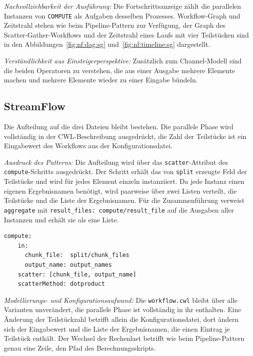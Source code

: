 \emph{Nachvollziehbarkeit der Ausführung:} Die Fortschrittsanzeige
zählt die parallelen Instanzen von \texttt{COMPUTE} als Aufgaben
desselben Prozesses. Workflow-Graph und Zeitstrahl stehen wie beim
Pipeline-Pattern zur Verfügung, der Graph des
Scatter-Gather-Workflows und der Zeitstrahl eines Laufs mit vier
Teilstücken sind in den Abbildungen~\ref{fig:nf:dag:sg}
und~\ref{fig:nf:timeline:sg} dargestellt.

\emph{Verständlichkeit aus Einsteigerperspektive:} Zusätzlich zum
Channel-Modell sind die beiden Operatoren zu verstehen, die aus einer
Ausgabe mehrere Elemente machen und mehrere Elemente wieder zu einer
Eingabe bündeln.

\subsection{StreamFlow}
\label{sec:lokal:sg:streamflow}

Die Aufteilung auf die drei Dateien bleibt bestehen. Die parallele
Phase wird vollständig in der CWL-Beschreibung ausgedrückt, die Zahl
der Teilstücke ist ein Eingabewert des Workflows aus der
Konfigurationsdatei.

\emph{Ausdruck des Patterns:} Die Aufteilung wird über das
\texttt{scatter}-Attribut des \texttt{compute}-Schritts ausgedrückt.
Der Schritt erhält das von \texttt{split} erzeugte Feld der
Teilstücke und wird für jedes Element einzeln instanziiert. Da jede
Instanz einen eigenen Ergebnisnamen benötigt, wird paarweise über
zwei Listen verteilt, die Teilstücke und die Liste der Ergebnisnamen.
Für die Zusammenführung verweist \texttt{aggregate} mit
\texttt{result\_files: compute/result\_file} auf die Ausgaben aller
Instanzen und erhält sie als eine Liste.

\begin{lstlisting}[caption={Fan-out über scatter am compute-Schritt (StreamFlow, Scatter-Gather)},label={lst:sg:sf}]
  compute:
    in:
      chunk_file:  split/chunk_files
      output_name: output_names
    scatter: [chunk_file, output_name]
    scatterMethod: dotproduct
\end{lstlisting}

\emph{Modellierungs- und Konfigurationsaufwand:} Die
\texttt{workflow.cwl} bleibt über alle Varianten unverändert, die
parallele Phase ist vollständig in ihr enthalten. Eine Änderung der
Teilstückzahl betrifft allein die Konfigurationsdatei, dort ändern
sich der Eingabewert und die Liste der Ergebnisnamen, die einen
Eintrag je Teilstück enthält. Der Wechsel der Rechenlast betrifft wie
beim Pipeline-Pattern genau eine Zeile, den Pfad des
Berechnungsskripts.


